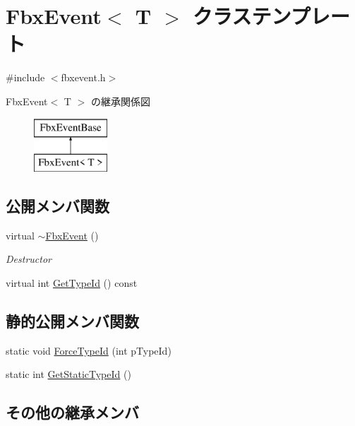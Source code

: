 \hypertarget{class_fbx_event}{}\section{Fbx\+Event$<$ T $>$ クラステンプレート}
\label{class_fbx_event}


{\ttfamily \#include $<$fbxevent.\+h$>$}

Fbx\+Event$<$ T $>$ の継承関係図\begin{figure}[H]
\begin{center}
\leavevmode
\includegraphics[height=2.000000cm]{class_fbx_event}
\end{center}
\end{figure}
\subsection*{公開メンバ関数}
\begin{DoxyCompactItemize}
\item 
virtual \hyperlink{class_fbx_event_a57f0d84cc53c4d29bcff0dceb091eed4}{$\sim$\+Fbx\+Event} ()
\begin{DoxyCompactList}\small\item\em Destructor \end{DoxyCompactList}\item 
virtual int \hyperlink{class_fbx_event_a96ae7ea5ee46f040f6493f6acecd5bba}{Get\+Type\+Id} () const
\end{DoxyCompactItemize}
\subsection*{静的公開メンバ関数}
\begin{DoxyCompactItemize}
\item 
static void \hyperlink{class_fbx_event_a0e3fe581649a5917208561a03ad61295}{Force\+Type\+Id} (int p\+Type\+Id)
\item 
static int \hyperlink{class_fbx_event_a9f2329973ee8cb60860d004cc2823c70}{Get\+Static\+Type\+Id} ()
\end{DoxyCompactItemize}
\subsection*{その他の継承メンバ}


